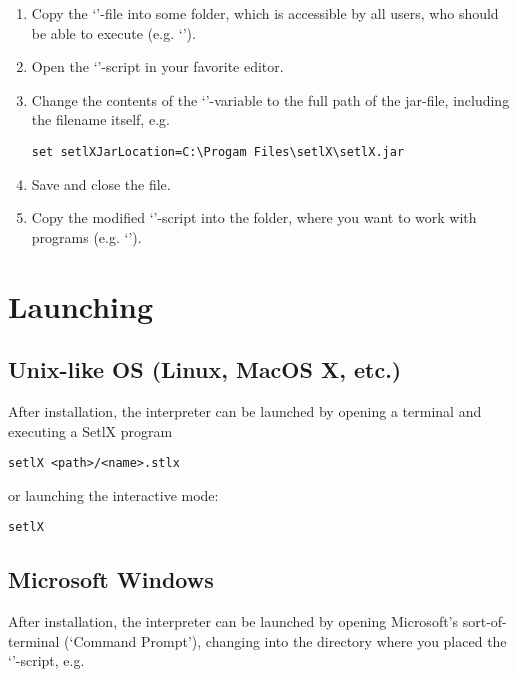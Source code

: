 \begin{enumerate}
	\item Copy the `'-file into some folder, which is accessible by all users, who should be able to execute \setlX{} (e.g. `').
	\item Open the `'-script in your favorite editor.
	\item Change the contents of the `'-variable to the full path of the jar-file, including the filename itself, e.g.
\begin{lstlisting}[frame=none,numbers=none]
set setlXJarLocation=C:\Progam Files\setlX\setlX.jar
\end{lstlisting}
	\item Save and close the file.
	\item Copy the modified `'-script into the folder, where you want to work with \setlX{} programs (e.g. `').
\end{enumerate}

\section{Launching}

\subsection{Unix-like OS (Linux, MacOS X, etc.)}

After installation, the \setlX{} interpreter can be launched by opening a terminal and executing a SetlX program

\begin{lstlisting}[frame=none,numbers=none]
setlX <path>/<name>.stlx
\end{lstlisting}

or launching the interactive mode:

\begin{lstlisting}[frame=none,numbers=none]
setlX
\end{lstlisting}

\subsection{Microsoft Windows}

After installation, the \setlX{} interpreter can be launched by opening Microsoft's sort-of-terminal (`Command Prompt'), changing into the directory where you placed the `'-script, e.g.

